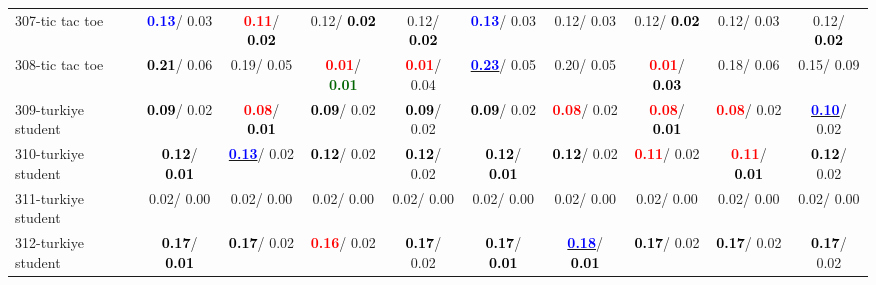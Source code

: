 \begin{table}[h]
\begin{center}
{\begin{tabular}{lc|c|c|c|c|c|c|c|c}
307-tic tac toe & \textcolor{blue}{\textbf{  0.13}}/  0.03 & \textcolor{red}{\textbf{  0.11}}/\textcolor{black}{\textbf{  0.02}} &   0.12/\textcolor{black}{\textbf{  0.02}} &   0.12/\textcolor{black}{\textbf{  0.02}} & \textcolor{blue}{\textbf{  0.13}}/  0.03 &   0.12/  0.03 &   0.12/\textcolor{black}{\textbf{  0.02}} &   0.12/  0.03 &   0.12/\textcolor{black}{\textbf{  0.02}} \\
308-tic tac toe & \textcolor{black}{\textbf{  0.21}}/  0.06 &   0.19/  0.05 & \textcolor{red}{\textbf{  0.01}}/\textcolor{darkgreen}{\textbf{  0.01}} & \textcolor{red}{\textbf{  0.01}}/  0.04 & \underline{\textcolor{blue}{\textbf{  0.23}}}/  0.05 &   0.20/  0.05 & \textcolor{red}{\textbf{  0.01}}/\textcolor{black}{\textbf{  0.03}} &   0.18/  0.06 &   0.15/  0.09 \\
309-turkiye student & \textcolor{black}{\textbf{  0.09}}/  0.02 & \textcolor{red}{\textbf{  0.08}}/\textcolor{black}{\textbf{  0.01}} & \textcolor{black}{\textbf{  0.09}}/  0.02 & \textcolor{black}{\textbf{  0.09}}/  0.02 & \textcolor{black}{\textbf{  0.09}}/  0.02 & \textcolor{red}{\textbf{  0.08}}/  0.02 & \textcolor{red}{\textbf{  0.08}}/\textcolor{black}{\textbf{  0.01}} & \textcolor{red}{\textbf{  0.08}}/  0.02 & \underline{\textcolor{blue}{\textbf{  0.10}}}/  0.02 \\ \hline
310-turkiye student & \textcolor{black}{\textbf{  0.12}}/\textcolor{black}{\textbf{  0.01}} & \underline{\textcolor{blue}{\textbf{  0.13}}}/  0.02 & \textcolor{black}{\textbf{  0.12}}/  0.02 & \textcolor{black}{\textbf{  0.12}}/  0.02 & \textcolor{black}{\textbf{  0.12}}/\textcolor{black}{\textbf{  0.01}} & \textcolor{black}{\textbf{  0.12}}/  0.02 & \textcolor{red}{\textbf{  0.11}}/  0.02 & \textcolor{red}{\textbf{  0.11}}/\textcolor{black}{\textbf{  0.01}} & \textcolor{black}{\textbf{  0.12}}/  0.02 \\
311-turkiye student &   0.02/  0.00 &   0.02/  0.00 &   0.02/  0.00 &   0.02/  0.00 &   0.02/  0.00 &   0.02/  0.00 &   0.02/  0.00 &   0.02/  0.00 &   0.02/  0.00 \\
312-turkiye student & \textcolor{black}{\textbf{  0.17}}/\textcolor{black}{\textbf{  0.01}} & \textcolor{black}{\textbf{  0.17}}/  0.02 & \textcolor{red}{\textbf{  0.16}}/  0.02 & \textcolor{black}{\textbf{  0.17}}/  0.02 & \textcolor{black}{\textbf{  0.17}}/\textcolor{black}{\textbf{  0.01}} & \underline{\textcolor{blue}{\textbf{  0.18}}}/\textcolor{black}{\textbf{  0.01}} & \textcolor{black}{\textbf{  0.17}}/  0.02 & \textcolor{black}{\textbf{  0.17}}/  0.02 & \textcolor{black}{\textbf{  0.17}}/  0.02 \\

\end{tabular}}
\end{center}
\end{table}
